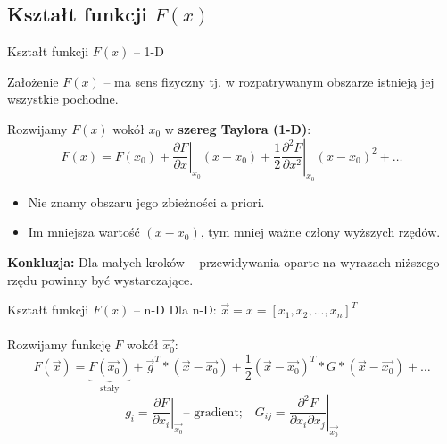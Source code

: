 \subsection{Kształt funkcji $ F(x) $}
  \begin{frame}{Kształt funkcji $ F(x) $ -- 1-D}
    \begin{block}{Założenie}
      $ F(x) $ -- ma sens fizyczny tj. w rozpatrywanym
      obszarze istnieją jej wszystkie pochodne.
    \end{block}
    Rozwijamy $F(x)$ wokół $x_0$ w \textbf{szereg Taylora (1-D)}:
    \begin{displaymath}
      F(x) = F(x_0) + \left. \frac{\partial F}{\partial x} \right|_{x_0}(x - x_0) +
      \left. \frac{1}{2} \frac{\partial^2 F}{\partial x^2} \right|_{x_0}(x - x_0)^2 +
      \dots
    \end{displaymath}
    \begin{itemize}
      \item Nie znamy obszaru jego zbieżności a priori.
      \item Im mniejsza wartość $ (x - x_0) $, tym mniej ważne człony
      wyższych rzędów.
    \end{itemize}
    \textbf{Konkluzja:} Dla małych kroków -- przewidywania oparte
    na wyrazach niższego rzędu powinny być wystarczające.

  \end{frame}

  \begin{frame}{Kształt funkcji $ F(x) $ -- n-D}
    Dla n-D: $ \vec{x} = x = [x_1, x_2, ..., x_n]^T $ \\
    \text{ } \\
    Rozwijamy funkcję $ F $ wokół $ \vec{x_0} $:
    \begin{displaymath}
      F(\vec{x}) = \underbrace{F(\vec{x_0})}_{\text{stały}} +
      \vec{g}^T * (\vec{x} - \vec{x_0}) +
      \frac{1}{2}(\vec{x} - \vec{x_0})^T * G * (\vec{x} - \vec{x_0}) + \dots
    \end{displaymath}
    \begin{displaymath}
      g_i = \left. \frac{\partial F}{\partial x_i} \right|_{\vec{x_0}} \text{-- gradient;}\quad
      G_{ij} = \left. \frac{\partial^2 F}{\partial x_i \partial x_j} \right|_{\vec{x_0}}
    \end{displaymath}

  \end{frame}


